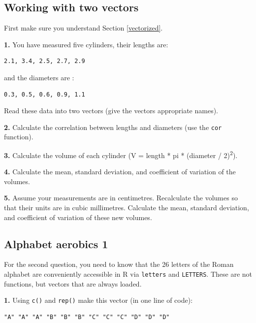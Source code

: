 \documentclass[]{book}
\begin{document}
\hypertarget{working-with-two-vectors}{%
\subsection{Working with two vectors}\label{working-with-two-vectors}}

First make sure you understand Section \ref{vectorized}.

\textbf{1.} You have measured five cylinders, their lengths are:

\begin{verbatim}
2.1, 3.4, 2.5, 2.7, 2.9
\end{verbatim}

and the diameters are :

\begin{verbatim}
0.3, 0.5, 0.6, 0.9, 1.1
\end{verbatim}

Read these data into two vectors (give the vectors appropriate names).

\textbf{2.} Calculate the correlation between lengths and diameters (use the \texttt{cor} function).

\textbf{3.} Calculate the volume of each cylinder (V = length * pi * (diameter / 2)\textsuperscript{2}).

\textbf{4.} Calculate the mean, standard deviation, and coefficient of variation of the volumes.

\textbf{5.} Assume your measurements are in centimetres. Recalculate the volumes so that their units are in cubic millimetres. Calculate the mean, standard deviation, and coefficient of variation of these new volumes.

\hypertarget{alphabet-aerobics-1}{%
\subsection{Alphabet aerobics 1}\label{alphabet-aerobics-1}}

For the second question, you need to know that the 26 letters of the Roman alphabet are conveniently accessible in R via \texttt{letters} and \texttt{LETTERS}. These are not functions, but vectors that are always loaded.

\textbf{1.} Using \texttt{c()} and \texttt{rep()} make this vector (in one line of code):

\begin{verbatim}
"A" "A" "A" "B" "B" "B" "C" "C" "C" "D" "D" "D"
\end{verbatim}
\end{document}
